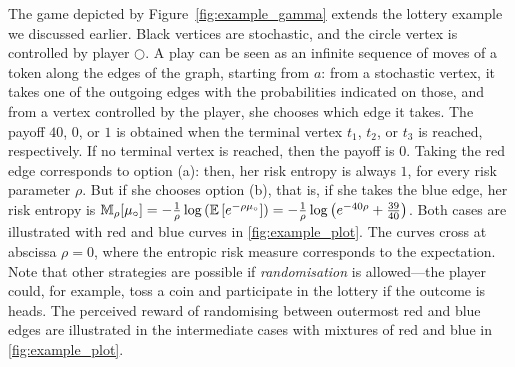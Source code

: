 The game depicted by Figure~\ref{fig:example_gamma} extends the lottery example we discussed earlier. 
Black vertices are stochastic, and the circle vertex is controlled by player $\Circle$.
A play can be seen as an infinite sequence of moves of a token along the edges of the graph, starting from $a$: from a stochastic vertex, it takes one of the outgoing edges with the probabilities indicated on those, and from a vertex controlled by the player, she chooses which edge it takes.
The payoff $40$, $0$, or $1$ is obtained when the terminal vertex $t_1$, $t_2$, or $t_3$ is reached, respectively.
If no terminal vertex is reached, then the payoff is $0$.
Taking the red edge corresponds to option (a): then, her risk entropy is always $1$, for every risk parameter $\rho$.
But if she chooses option (b), that is, if she takes the blue edge, her risk entropy is $\mathbb{M}_\rho[\mu_{\circ}] = -\frac{1}{\rho} \log \left( \mathbb{E} \left[ e^{-\rho \mu_{\circ}}\right] \right) = -\frac{1}{\rho} \log \left(  e^{-40\rho } + \frac{39}{40} \right)$.
Both cases are illustrated with red and blue curves in \cref{fig:example_plot}.
The curves cross at abscissa $\rho = 0$, where the entropic risk measure corresponds to the expectation. Note that other strategies are possible if \emph{randomisation} is allowed---the player could, for example, toss a coin and participate in the lottery if the outcome is heads. The perceived reward of randomising between outermost red and blue edges are illustrated in the intermediate cases with mixtures of red and blue in \cref{fig:example_plot}.




 
